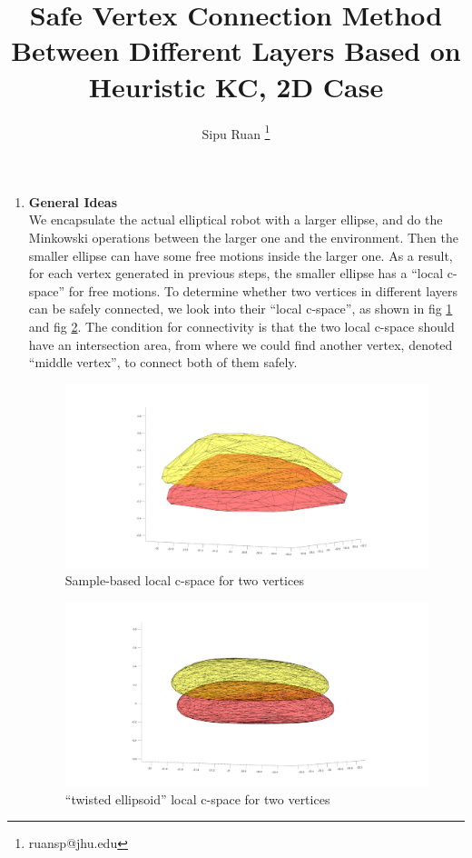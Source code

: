 \documentclass{article}
\title{Safe Vertex Connection Method Between Different Layers Based on Heuristic KC, 2D Case}
\author{Sipu Ruan \thanks{ruansp@jhu.edu}}
\begin{document}
\maketitle

\begin{enumerate}
\item {\bf General Ideas}\\
We encapsulate the actual elliptical robot with a larger ellipse, and do the Minkowski operations between the larger one and the environment. Then the smaller ellipse can have some free motions inside the larger one. As a result, for each vertex generated in previous steps, the smaller ellipse has a ``local c-space'' for free motions. To determine whether two vertices in different layers can be safely connected, we look into their ``local c-space'', as shown in fig \ref{fig:c-space} and fig \ref{fig:c-space-fitted}. The condition for connectivity is that the two local c-space should have an intersection area, from where we could find another vertex, denoted ``middle vertex'', to connect both of them safely.

\begin{figure}[h]
\centering
\includegraphics[scale=0.1]{layer_connection_c-space.png}
\caption{Sample-based local c-space for two vertices}
\label{fig:c-space}
\end{figure}
\begin{figure}[h]
\centering
\includegraphics[scale=0.1]{layer_connection_c-space_fitted.png}
\caption{``twisted ellipsoid'' local c-space for two vertices}
\label{fig:c-space-fitted}
\end{figure}


\end{enumerate}
\end{document}
